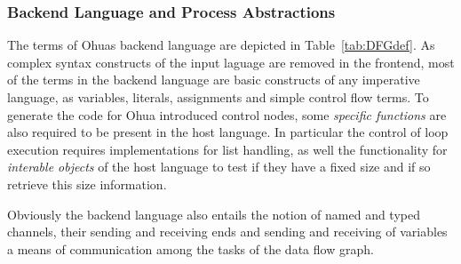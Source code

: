 \subsubsection{Backend Language and Process Abstractions}
\label{subsec:BackendRequirements}
The terms of Ohuas backend language are depicted in Table~\ref{tab:DFGdef}. As complex syntax constructs of the input laguage are removed in the frontend, most of the terms in the backend language are basic constructs of any imperative language, as variables, literals, assignments and simple control flow terms. To generate the code for Ohua introduced control nodes, some \emph{specific functions} are also required to be present in the host language. In particular the control of loop execution requires implementations for list handling, as well the functionality for \emph{interable objects} of the host language to test if they have a fixed size and if so retrieve this size information. 

Obviously the backend language also entails the notion of named and typed channels, their sending and receiving ends and sending and receiving of variables a means of communication among the tasks of the data flow graph. 

